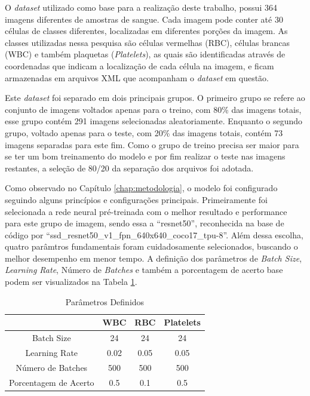 O \emph{dataset} utilizado como base para a realização deste trabalho, possui 364 imagens diferentes de amostras de sangue. Cada imagem pode conter até 30 células de classes diferentes, localizadas em diferentes porções da imagem. As classes utilizadas nessa pesquisa são células vermelhas (RBC), células brancas (WBC) e também plaquetas (\emph{Platelets}), as quais são identificadas através de coordenadas que indicam a localização de cada célula na imagem, e ficam armazenadas em arquivos XML que acompanham o \emph{dataset} em questão.

Este \emph{dataset} foi separado em dois principais grupos. O primeiro grupo se refere ao conjunto de imagens voltados apenas para o treino, com 80\% das imagens totais, esse grupo contém 291 imagens selecionadas aleatoriamente. Enquanto o segundo grupo, voltado apenas para o teste, com 20\% das imagens totais, contém 73 imagens separadas para este fim. Como o grupo de treino precisa ser maior para se ter um bom treinamento do modelo e por fim realizar o teste nas imagens restantes, a seleção de 80/20 da separação dos arquivos foi adotada.

Como observado no Capítulo \ref{chap:metodologia}, o modelo foi configurado seguindo alguns princípios e configurações principais. Primeiramente foi selecionada a rede neural pré-treinada com o melhor resultado e performance para este grupo de imagem, sendo essa a ``resnet50'', reconhecida na base de código por ``ssd\_resnet50\_v1\_fpn\_640x640\_coco17\_tpu-8''. Além dessa escolha, quatro parâmtros fundamentais foram cuidadosamente selecionados, buscando o melhor desempenho em menor tempo. A definição dos parâmetros de \emph{Batch Size}, \emph{Learning Rate}, Número de \emph{Batches} e também a porcentagem de acerto base podem ser visualizados na Tabela \ref{tbl:parametros}.

\begin{table}[!htb]
\centering
\caption{Parâmetros Definidos}
\label{tbl:parametros}
\begin{tabular}{|c|c|c|c|}
\hline
                      & WBC  & RBC  & Platelets \\ \hline
Batch Size            & 24   & 24   & 24        \\ \hline
Learning Rate         & 0.02 & 0.05 & 0.05      \\ \hline
Número de Batches     & 500  & 500  & 500       \\ \hline
Porcentagem de Acerto & 0.5 & 0.1 & 0.5      \\ \hline
\end{tabular}
	\vspace{6pt}
\end{table}

